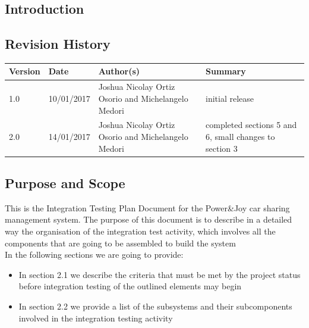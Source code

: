 \documentclass{article}
\begin{document}
\newpage   			
\begin{flushleft}  

  \section{Introduction}	%
  \subsection{Revision History} 	%
  
  \begin{center}
    \begin{tabular}{ | p{2cm} | p{2cm} |  p{7 cm} | p{4cm} |}
    \hline
    \textbf{Version} &  \textbf{Date} & \textbf{Author(s)} & \textbf{Summary}  \\ 
    \hline
    
    1.0 & 10/01/2017 & Joshua Nicolay Ortiz Osorio and Michelangelo Medori & initial release
     \\ 
  \hline
  
  
  2.0 & 14/01/2017 & Joshua Nicolay Ortiz Osorio and Michelangelo Medori & completed sections 5 and 6, small changes to section 3\\
  \hline
  
    \end{tabular}
\end{center}
	
  \subsection{Purpose and Scope}		%
  This is the  Integration Testing Plan Document for the Power\&Joy car sharing management system.
  The purpose of this document is to describe in a detailed way the organisation of the integration test activity, which involves all the components that are going to be assembled to build the system\\
  In the following sections we are going to provide:\\
  \begin{itemize}
     \item In section 2.1 we describe the criteria that must be met by the project status before integration testing of the outlined elements may begin
  
  \item In section 2.2 we provide a list of the subsystems and their subcomponents involved in the integration testing  activity 


\end{itemize}
\end{flushleft}
\end{document}
